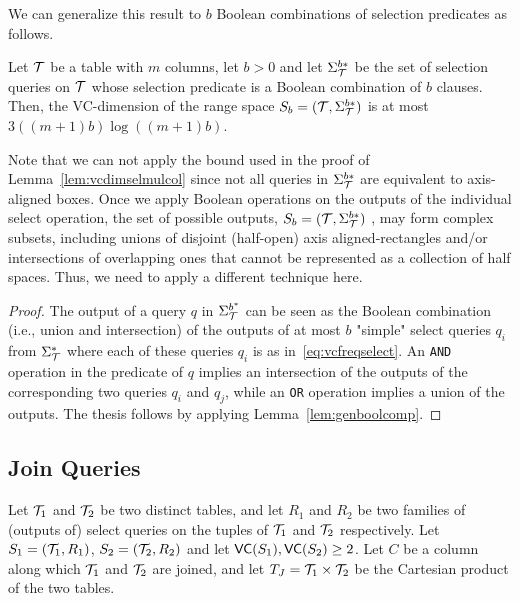 We can generalize this result to $b$ Boolean combinations of selection
predicates as follows.

\begin{lemma}\label{lem:vcdimselgen}
  Let ${\cal T}$ be a table with $m$ columns, let $b>0$ and let $\Sigma^{b*}_{\cal T}$
  be the set of selection queries on ${\cal T}$ whose selection predicate is a
  Boolean combination of $b$ clauses. Then, the VC-dimension of the range space
  $S_b = ({\cal T}, \Sigma^{b*}_{\cal T})$ is at most $3((m+1)b)\log((m+1)b)$.  
\end{lemma}

Note that we can not apply the bound
used in the proof of Lemma~\ref{lem:vcdimselmulcol} since
not all queries in $\Sigma^{b*}_{\cal T}$ are equivalent to axis-aligned
boxes. Once we apply Boolean operations on the outputs of the individual select
operation, the set of possible outputs, $S_b = ({\cal T}, \Sigma^{b*}_{\cal T})$ , may
form complex subsets, including unions of disjoint (half-open) axis
aligned-rectangles and/or intersections of overlapping ones that cannot be
represented as a collection of half spaces. Thus, we need to apply a different technique here.

\begin{proof} 
 The output of a query $q$ in $\Sigma^{b^*}_{\cal T}$ can be seen as the Boolean
 combination (i.e., union and intersection) of the outputs of at most $b$
 "simple" select queries $q_i$ from $\Sigma^{*}_{\cal T}$ where each of these
 queries $q_i$ is as in~\eqref{eq:vcfreqselect}. An \texttt{AND} operation in the
 predicate of $q$ implies an intersection of the outputs of  the corresponding
 two queries $q_i$ and $q_j$, while an \texttt{OR} operation implies a union of
 the outputs. The thesis follows by applying Lemma~\ref{lem:genboolcomp}.
\end{proof}

\subsection{Join Queries}\label{sec:vcfreqvcdimjoinqueries}
Let ${\cal T}_1$ and ${\cal T}_2$ be two distinct tables, and let $R_1$ and $R_2$
be two families of (outputs of) select queries on the tuples of ${\cal T}_1$ and
${\cal T}_2$ respectively. Let $S_1=({\cal T}_1,R_1)$, $S_2=({\cal T}_2,R_2)$ and let
$\mathsf{VC}(S_1),\mathsf{VC}(S_2)\geq 2$. Let $C$ be a column along which ${\cal T}_1$ and ${\cal T}_2$
are joined, and let $T_J={\cal T}_1\times{\cal T}_2$ be the Cartesian product of the two
tables.

